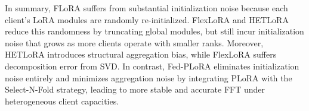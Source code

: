 \documentclass{article} %
\begin{document}

In summary, FLoRA suffers from substantial initialization noise because each client’s LoRA modules are randomly re-initialized. FlexLoRA and HETLoRA reduce this randomness by truncating global modules, but still incur initialization noise that grows as more clients operate with smaller ranks. Moreover, HETLoRA introduces structural aggregation bias, while FlexLoRA suffers decomposition error from SVD. In contrast, Fed-PLoRA eliminates initialization noise entirely and minimizes aggregation noise by integrating PLoRA with the Select-N-Fold strategy, leading to more stable and accurate FFT under heterogeneous client capacities. 
\end{document}
